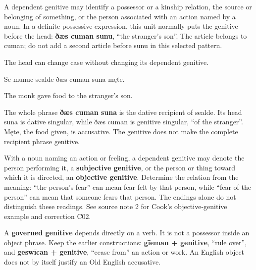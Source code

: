 A dependent genitive may identify a possessor or a kinship relation, the source or belonging of something, or the person associated with an action named by a noun. In a definite possessive expression, this unit normally puts the genitive before the head: \textbf{ðæs cuman sunu}, “the stranger's son”. The article belongs to cuman; do not add a second article before sunu in this selected pattern.

The head can change case without changing its dependent genitive.

Se munuc sealde ðæs cuman suna męte.

The monk gave food to the stranger’s son.

The whole phrase \textbf{ðæs cuman suna} is the dative recipient of sealde. Its head suna is dative singular, while ðæs cuman is genitive singular, “of the stranger”. Męte, the food given, is accusative. The genitive does not make the complete recipient phrase genitive.

With a noun naming an action or feeling, a dependent genitive may denote the person performing it, a \textbf{subjective genitive}, or the person or thing toward which it is directed, an \textbf{objective genitive}. Determine the relation from the meaning: “the person's fear” can mean fear felt by that person, while “fear of the person” can mean that someone fears that person. The endings alone do not distinguish these readings. See source note 2 for Cook's objective-genitive example and correction C02.

A \textbf{governed genitive} depends directly on a verb. It is not a possessor inside an object phrase. Keep the earlier constructions: \textbf{gīeman + genitive}, “rule over”, and \textbf{geswīcan + genitive}, “cease from” an action or work. An English object does not by itself justify an Old English accusative.

